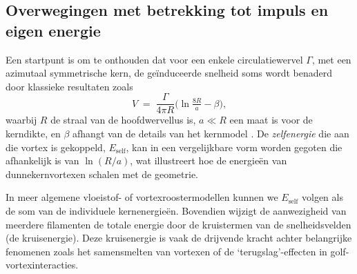 \subsection{Overwegingen met betrekking tot impuls en eigen energie}
\label{sec:impuls}
Een startpunt is om te onthouden dat voor een enkele circulatiewervel $\Gamma$, met een
azimutaal symmetrische kern, de geïnduceerde snelheid soms wordt benaderd door
klassieke resultaten zoals
\begin{equation}
V \;=\; \frac{\Gamma}{4 \pi R}
\bigl(\ln \tfrac{8 R}{a} - \beta \bigr),\label{eq:appendix:velocity}
\end{equation}
waarbij $R$ de straal van de hoofdwervellus is, $a \ll R$ een maat is voor de kerndikte,
en $\beta$ afhangt van de details van het kernmodel \cite{Saffman1992}. De
\emph{zelfenergie} die aan die vortex is gekoppeld, $E_{\text{self}}$, kan in een
vergelijkbare vorm worden gegoten die afhankelijk is van $\ln(R/a)$, wat illustreert hoe de energieën van dunnekernvortexen
schalen met de geometrie.

In meer algemene vloeistof- of vortexroostermodellen kunnen we $E_{\text{self}}$ volgen als de
som van de individuele kernenergieën. Bovendien wijzigt de aanwezigheid van meerdere filamenten
de totale energie door de kruistermen van de snelheidsvelden (de kruisenergie). Deze
kruisenergie is vaak de drijvende kracht achter belangrijke fenomenen zoals het samensmelten van vortexen of de `terugslag'-effecten
in golf-vortexinteracties.

